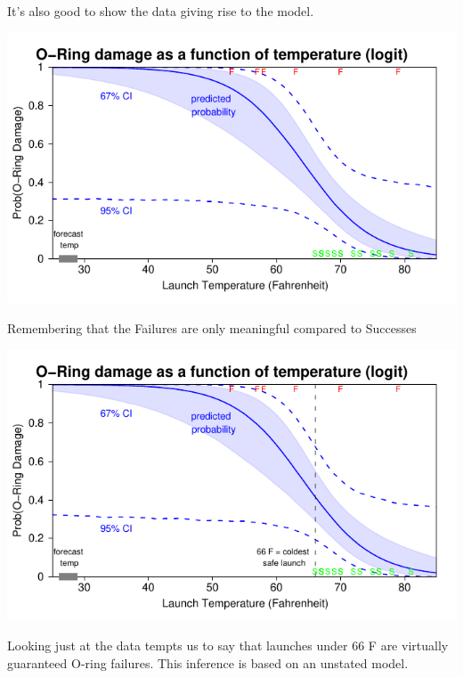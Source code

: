 \documentclass[pdflatex,landscape,titlepage]{foils}
\begin{document}
It's also good to show the data giving rise to the model.

\foilhead[-0.75in]{}

\color{black}
\begin{center}
\includegraphics[width=10.5 in]{chall4}
\end{center}

Remembering that the Failures are only meaningful compared to Successes

\foilhead[-0.75in]{}

\color{black}
\begin{center}
\includegraphics[width=10.5 in]{chall5}
\end{center}

\vspace{-2 em}

Looking just at the data tempts us to say that launches under 66 F are virtually guaranteed O-ring failures.  This inference is based on an unstated model.

\foilhead[-0.75in]{}
\end{document}
